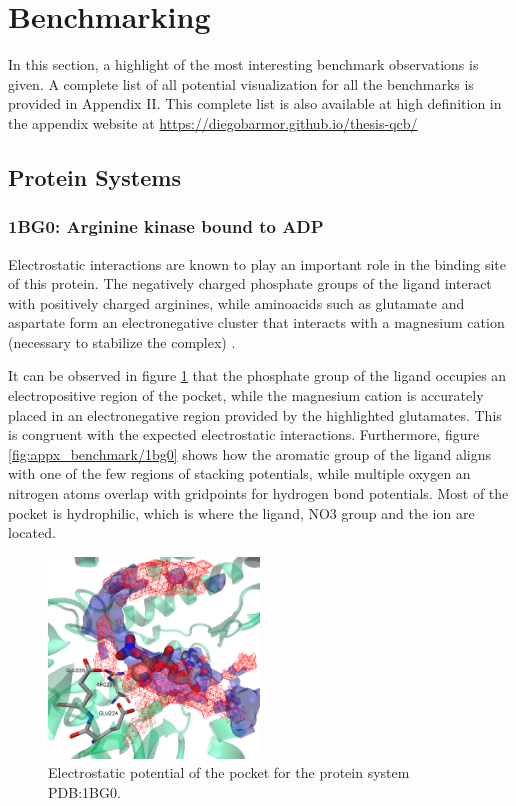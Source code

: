 \section{Benchmarking}
  In this section, a highlight of the most interesting benchmark observations is given. A complete list of all potential visualization for all the benchmarks is provided in Appendix II. This complete list is also available at high definition in the appendix website at \url{https://diegobarmor.github.io/thesis-qcb/}

  \pagebreak
  \subsection{Protein Systems}
    \subsubsection{1BG0: Arginine kinase bound to ADP}
      Electrostatic interactions are known to play an important role in the binding site of this protein. The negatively charged phosphate groups of the ligand interact with positively charged arginines, while aminoacids such as glutamate and aspartate form an electronegative cluster that interacts with a magnesium cation (necessary to stabilize the complex) \cite{benchmark_negative_2000}.

      It can be observed in figure \ref{fig:benchmark/1bg0} that the phosphate group of the ligand occupies an electropositive region of the pocket, while the magnesium cation is accurately placed in an electronegative region provided by the highlighted glutamates. This is congruent with the expected electrostatic interactions. Furthermore, figure \ref{fig:appx_benchmark/1bg0} shows how the aromatic group of the ligand aligns with one of the few regions of stacking potentials, while multiple oxygen an nitrogen atoms overlap with gridpoints for hydrogen bond potentials. Most of the pocket is hydrophilic, which is where the ligand, NO3 group and the ion are located.

      \begin{figure}[H]
        \centering
        \includegraphics[width=0.5\textwidth]{figures/results/benchmark_prot/1bg0.png}
        \caption{\label{fig:benchmark/1bg0} Electrostatic potential of the pocket for the protein system PDB:1BG0.}
      \end{figure}
    \pagebreak

